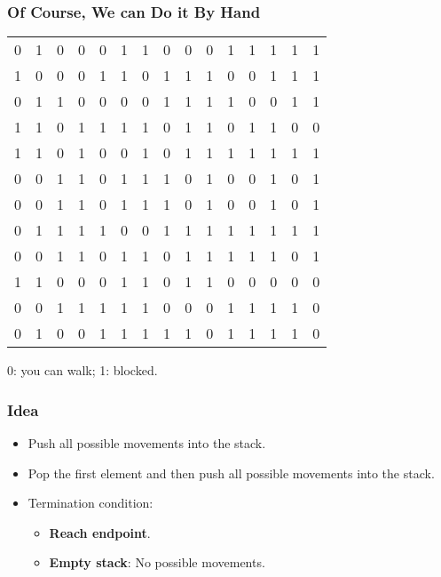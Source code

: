 \documentclass[11pt]{beamer}
\begin{document}
\begin{frame}
\frametitle{Of Course, We can Do it By Hand}
\begin{center}
\begin{tabular}{|ccccccccccccccc|}
\hline
{\color{blue}0} & 1 & {\color{red}0} & {\color{red}0} & 0 & 1 & 1 & 0 & 0 & 0 & 1 & 1 & 1 & 1 & 1 \\
1 & {\color{red}0} & 0 & {\color{red}0} & 1 & 1 & 0 & 1 & 1 & 1 & 0 & 0 & 1 & 1 & 1 \\
0 & 1 & 1 & {\color{red}0} & 0 & 0 & 0 & 1 & 1 & 1 & 1 & 0 & 0 & 1 & 1 \\
1 & 1 & {\color{red}0} & 1 & 1 & 1 & 1 & 0 & 1 & 1 & 0 & 1 & 1 & 0 & 0 \\
1 & 1 & {\color{red}0} & 1 & 0 & 0 & 1 & 0 & 1 & 1 & 1 & 1 & 1 & 1 & 1 \\
{\color{red}0} & {\color{red}0} & 1 & 1 & 0 & 1 & 1 & 1 & 0 & 1 & 0 & 0 & 1 & 0 & 1 \\
{\color{red}0} & 0 & 1 & 1 & 0 & 1 & 1 & 1 & 0 & 1 & 0 & 0 & 1 & 0 & 1 \\
{\color{red}0} & 1 & 1 & 1 & 1 & {\color{red}0} & {\color{red}0} & 1 & 1 & 1 & 1 & 1 & 1 & 1 & 1 \\
{\color{red}0} & {\color{red}0} & 1 & 1 & {\color{red}0} & 1 & 1 & {\color{red}0} & 1 & 1 & 1 & 1 & 1 & 0 & 1 \\
1 & 1 & {\color{red}0} & {\color{red}0} & {\color{red}0} & 1 & 1 & {\color{red}0} & 1 & 1 & {\color{red}0} & {\color{red}0} & {\color{red}0} & {\color{red}0} & {\color{red}0} \\
0 & 0 & 1 & 1 & 1 & 1 & 1 & {\color{red}0} & {\color{red}0} & {\color{red}0} & 1 & 1 & 1 & 1 & {\color{red}0} \\
0 & 1 & 0 & 0 & 1 & 1 & 1 & 1 & 1 & 0 & 1 & 1 & 1 & 1 & {\color{blue}0} \\
\hline
\end{tabular}
\end{center}
0: you can walk; 1: blocked.
\end{frame}

\begin{frame}
\frametitle{Idea}
\begin{itemize}
\item Push all possible movements into the stack.
\item Pop the first element and then push all possible movements into the stack.
\item Termination condition:
    \begin{itemize}
    \item {\bf Reach endpoint}.
    \item {\bf Empty stack}: {\color{red}No possible movements}.
    \end{itemize}
\end{itemize}
\end{frame}
\end{document}
